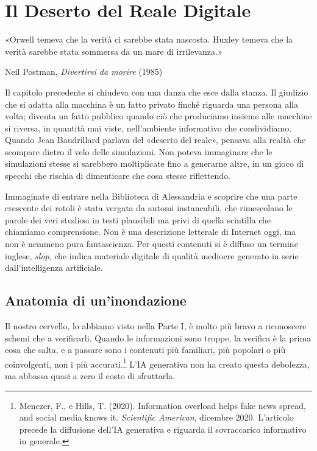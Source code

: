 \chapter{Il Deserto del Reale Digitale}
\label{cap:p4c39}

\epigraph{«Orwell temeva che la verità ci sarebbe stata nascosta. Huxley temeva che la verità sarebbe stata sommersa da un mare di irrilevanza.»}{Neil Postman, \textit{Divertirsi da morire} (1985)}

Il capitolo precedente si chiudeva con una danza che esce dalla stanza. Il giudizio che si adatta alla macchina è un fatto privato finché riguarda una persona alla volta; diventa un fatto pubblico quando ciò che produciamo insieme alle macchine si riversa, in quantità mai viste, nell'ambiente informativo che condividiamo. Quando Jean Baudrillard parlava del «deserto del reale», pensava alla realtà che scompare dietro il velo delle simulazioni. Non poteva immaginare che le simulazioni stesse si sarebbero moltiplicate fino a generarne altre, in un gioco di specchi che rischia di dimenticare che cosa stesse riflettendo.

Immaginate di entrare nella Biblioteca di Alessandria e scoprire che una parte crescente dei rotoli è stata vergata da automi instancabili, che rimescolano le parole dei veri studiosi in testi plausibili ma privi di quella scintilla che chiamiamo comprensione. Non è una descrizione letterale di Internet oggi, ma non è nemmeno pura fantascienza. Per questi contenuti si è diffuso un termine inglese, \textit{slop}, che indica materiale digitale di qualità mediocre generato in serie dall'intelligenza artificiale.

\section{Anatomia di un'inondazione}

Il nostro cervello, lo abbiamo visto nella Parte I, è molto più bravo a riconoscere schemi che a verificarli. Quando le informazioni sono troppe, la verifica è la prima cosa che salta, e a passare sono i contenuti più familiari, più popolari o più coinvolgenti, non i più accurati.\footnote{Menczer, F., e Hills, T. (2020). Information overload helps fake news spread, and social media knows it. \textit{Scientific American}, dicembre 2020. L'articolo precede la diffusione dell'IA generativa e riguarda il sovraccarico informativo in generale.} L'IA generativa non ha creato questa debolezza, ma abbassa quasi a zero il costo di sfruttarla.

